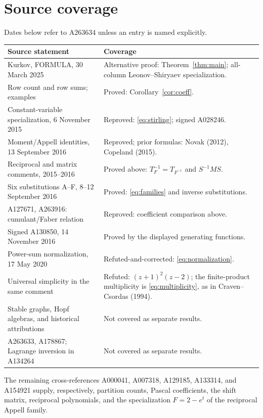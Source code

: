 \documentclass[11pt]{article}
\begin{document}
\section{Source coverage}
Dates below refer to A263634 unless an entry is named explicitly.
\begin{center}\small
\begin{tabular}{@{}p{.48\linewidth}p{.45\linewidth}@{}}
\toprule
Source statement & Coverage\\\midrule
Kurkov, FORMULA, 30 March 2025 & Alternative proof: Theorem~\ref{thm:main}; all-column Leonov--Shiryaev specialization.\\
Row count and row sums; examples & Proved: Corollary~\ref{cor:coeff}.\\
Constant-variable specialization, 6 November 2015 & Reproved: \eqref{eq:stirling}; signed A028246.\\
Moment/Appell identities, 13 September 2016 & Reproved; prior formulas: Novak (2012), Copeland (2015).\\
Reciprocal and matrix comments, 2015--2016 & Proved above: $T_F^{-1}=T_{F^{-1}}$ and $S^{-1}MS$.\\
Six substitutions A--F, 8--12 September 2016 & Proved: \eqref{eq:families} and inverse substitutions.\\
A127671, A263916: cumulant/Faber relation & Reproved: coefficient comparison above.\\
Signed A130850, 14 November 2016 & Proved by the displayed generating functions.\\
Power-sum normalization, 17 May 2020 & Refuted-and-corrected: \eqref{eq:normalization}.\\
Universal simplicity in the same comment & Refuted: $(z+1)^2(z-2)$; the finite-product multiplicity is \eqref{eq:multiplicity}, as in Craven--Csordas (1994).\\
Stable graphs, Hopf algebras, and historical attributions & Not covered as separate results.\\
A263633, A178867; Lagrange inversion in A134264 & Not covered as separate results.\\
\bottomrule
\end{tabular}
\end{center}
The remaining cross-references A000041, A007318, A129185, A133314,
and A154921 supply, respectively, partition counts, Pascal coefficients,
the shift matrix, reciprocal polynomials, and the specialization
$F=2-e^t$ of the reciprocal Appell family.
\end{document}
